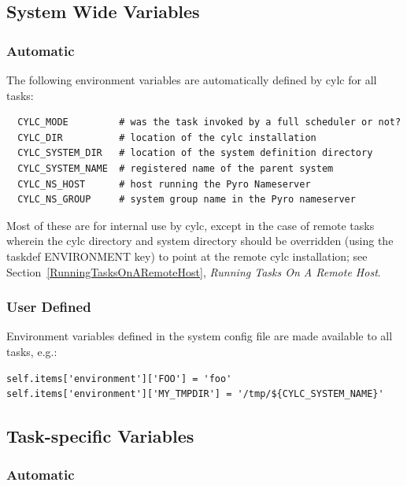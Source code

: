 \documentclass[11pt,a4paper]{article}
\begin{document}
\subsection{System Wide Variables}
\lstset{language=bash}

\subsubsection{Automatic}
The following environment variables are automatically defined by cylc
for all tasks:

\begin{lstlisting}
  CYLC_MODE         # was the task invoked by a full scheduler or not?
  CYLC_DIR          # location of the cylc installation
  CYLC_SYSTEM_DIR   # location of the system definition directory
  CYLC_SYSTEM_NAME  # registered name of the parent system 
  CYLC_NS_HOST      # host running the Pyro Nameserver
  CYLC_NS_GROUP     # system group name in the Pyro nameserver
\end{lstlisting}

Most of these are for internal use by cylc, except in the case of remote
tasks wherein the cylc directory and system directory should be
overridden (using the taskdef ENVIRONMENT key) to point at the remote
cylc installation; see Section~\ref{RunningTasksOnARemoteHost}, {\em
Running Tasks On A Remote Host}. 

\subsubsection{User Defined}
\label{SystemWideVariables}

Environment variables defined in the system config file are made
available to all tasks, e.g.: 

\lstset{language=Python}

\begin{lstlisting}
self.items['environment']['FOO'] = 'foo'
self.items['environment']['MY_TMPDIR'] = '/tmp/${CYLC_SYSTEM_NAME}'
\end{lstlisting}


\subsection{Task-specific Variables}
\lstset{language=bash}

\subsubsection{Automatic}
\end{document}
